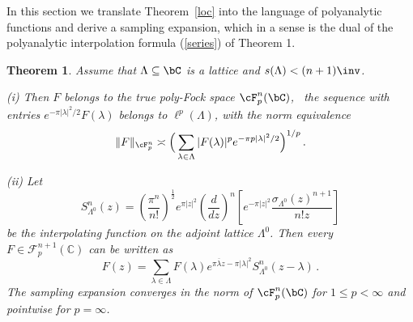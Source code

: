 \documentclass[12pt]{amsart}
\newtheorem{theorem}{Theorem}
\theoremstyle{plain}
\numberwithin{equation}{section}
\begin{document}
In this section we translate Theorem~\ref{loc} into the language of
polyanalytic functions and derive a sampling expansion, which in a sense is
the dual of the polyanalytic interpolation formula (\ref{series}) of Theorem
1.

\begin{theorem}
\label{sampfpo} Assume that $\Lambda \subseteq \bC $ is a lattice and $%
s(\Lambda )< (n+1)\inv $.

(i) Then $F$ belongs to the true poly-Fock space $\cF ^n_p (\bC )$, \fif\
the sequence with entries $e^{-\pi |\lambda |^2/2} F(\lambda )$ belongs to $%
\ell ^p (\Lambda )$, with the norm equivalence 
\begin{equation*}
\|F\|_{\cF ^n _p} \asymp \Big(\sum _{\lambda \in \Lambda } |F(\lambda )|^p
e^{-\pi p|\lambda |^2/2} \Big) ^{1/p} \, .
\end{equation*}

(ii) Let 
\begin{equation}
S_{\Lambda ^{0}}^{n}(z)=\left( \frac{\pi ^{n}}{n!}\right) ^{\frac{1}{2}%
}e^{\pi \left\vert z\right\vert ^{2}}\left( \frac{d}{dz}\right) ^{n}\left[
e^{-\pi \left\vert z\right\vert ^{2}}\frac{ \sigma _{\Lambda ^{0}}(z) ^{n+1}%
}{n!z}\right]  \label{eq:c13}
\end{equation}%
be the interpolating function on the adjoint lattice $\Lambda ^{0}$. Then
every $F\in \mathcal{F}_{p}^{n+1}(%
\mathbb{C}
)$ can be written as 
\begin{equation}
F(z)=\sum_{\lambda \in \Lambda }F(\lambda )e^{\pi \overline{\lambda }z-\pi
\left\vert \lambda \right\vert ^{2}}S_{\Lambda ^{0}}^{n}(z-\lambda )\,.
\label{eq:c6}
\end{equation}%
The sampling expansion converges in the norm of $\cF_{p}^{n}(\bC)$ for $%
1\leq p<\infty $ and pointwise for $p=\infty $.
\end{theorem}
\end{document}
